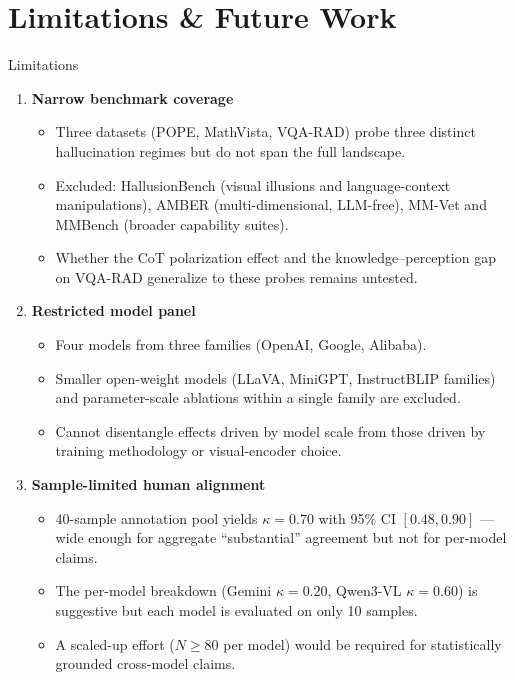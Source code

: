 \documentclass[9pt,aspectratio=169]{beamer}
\begin{document}
\section{Limitations \& Future Work}

\begin{frame}{Limitations}
  \scriptsize
  \begin{enumerate}\setlength{\itemsep}{0.6em}
    \item \textbf{Narrow benchmark coverage}
      \begin{itemize}
        \item Three datasets (POPE, MathVista, VQA-RAD) probe three distinct
              hallucination regimes but do not span the full landscape.
        \item Excluded: HallusionBench (visual illusions and language-context
              manipulations), AMBER (multi-dimensional, LLM-free),
              MM-Vet and MMBench (broader capability suites).
        \item Whether the CoT polarization effect and the
              knowledge--perception gap on VQA-RAD generalize
              to these probes remains untested.
      \end{itemize}

    \item \textbf{Restricted model panel}
      \begin{itemize}
        \item Four models from three families (OpenAI, Google, Alibaba).
        \item Smaller open-weight models (LLaVA, MiniGPT, InstructBLIP
              families) and parameter-scale ablations within a single family
              are excluded.
        \item Cannot disentangle effects driven by model scale from those
              driven by training methodology or visual-encoder choice.
      \end{itemize}

    \item \textbf{Sample-limited human alignment}
      \begin{itemize}
        \item 40-sample annotation pool yields $\kappa = 0.70$ with
              95\% CI $[0.48, 0.90]$ --- wide enough for aggregate
              ``substantial'' agreement but not for per-model claims.
        \item The per-model breakdown (Gemini $\kappa = 0.20$,
              Qwen3-VL $\kappa = 0.60$) is suggestive but each model
              is evaluated on only 10 samples.
        \item A scaled-up effort ($N \geq 80$ per model) would be
              required for statistically grounded cross-model claims.
      \end{itemize}
  \end{enumerate}
\end{frame}
\end{document}
